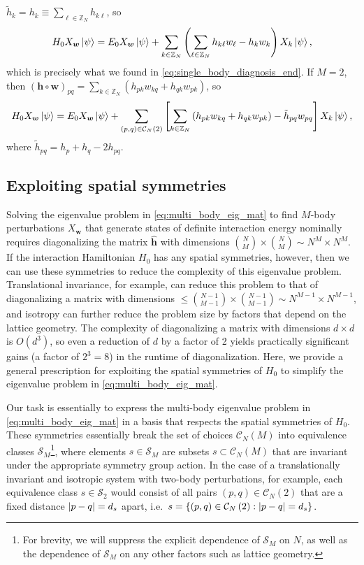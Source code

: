 \documentclass[nofootinbib,notitlepage,11pt]{revtex4-2}
\newcommand{\p}[1]{\left(#1\right)} %
\renewcommand{\sp}[1]{\left[#1\right]} %
\renewcommand{\set}[1]{\left\{#1\right\}} %
\newcommand{\m}{\bm} %
\newcommand{\1}{\mathds{1}}
\newcommand{\C}{\mathcal{C}}
\renewcommand{\S}{\mathcal{S}}
\newcommand{\ZZ}{\mathbb{Z}}
\begin{document}
$\tilde h_k = h_k \equiv \sum_{\ell\in\ZZ_N} h_{k\ell}$, so
\begin{align}
  H_0 X_{\m w} \ket\psi
  = E_0 X_{\m w} \ket\psi + \sum_{k\in\ZZ_N}
  \p{\sum_{\ell\in\ZZ_N} h_{k\ell} w_\ell - h_k w_k} X_k \ket\psi,
\end{align}
which is precisely what we found in
\eqref{eq:single_body_diagnosis_end}.  If $M=2$, then
$\p{\m h\circ\m w}_{pq} = \sum_{k\in\ZZ_N}
\p{h_{pk}w_{kq}+h_{qk}w_{pk}}$, so
\begin{align}
  H_0 X_{\m w} \ket\psi
  = E_0 X_{\m w} \ket\psi + \sum_{\p{p,q}\in\C_N\p{2}}
  \sp{\sum_{k\in\ZZ_N}\p{h_{pk} w_{kq} + h_{qk} w_{pk}}
    - \tilde h_{pq} w_{pq}}
  X_k \ket\psi,
\end{align}
where $\tilde h_{pq}=h_p+h_q-2h_{pq}$.

\subsection{Exploiting spatial symmetries}
\label{sec:symmetries}

Solving the eigenvalue problem in \eqref{eq:multi_body_eig_mat} to
find $M$-body perturbations $X_{\m w}$ that generate states of
definite interaction energy nominally requires diagonalizing the
matrix $\hat{\m h}$ with dimensions
${N\choose M}\times{N\choose M}\sim N^M\times N^M$.  If the
interaction Hamiltonian $H_0$ has any spatial symmetries, however,
then we can use these symmetries to reduce the complexity of this
eigenvalue problem.  Translational invariance, for example, can reduce
this problem to that of diagonalizing a matrix with dimensions
$\le{N-1\choose M-1}\times{N-1\choose M-1}\sim N^{M-1}\times N^{M-1}$,
and isotropy can further reduce the problem size by factors that
depend on the lattice geometry.  The complexity of diagonalizing a
matrix with dimensions $d\times d$ is $O\p{d^3}$, so even a reduction
of $d$ by a factor of 2 yields practically significant gains (a factor
of $2^3=8$) in the runtime of diagonalization.  Here, we provide a
general prescription for exploiting the spatial symmetries of $H_0$ to
simplify the eigenvalue problem in \eqref{eq:multi_body_eig_mat}.

Our task is essentially to express the multi-body eigenvalue problem
in \eqref{eq:multi_body_eig_mat} in a basis that respects the spatial
symmetries of $H_0$.  These symmetries essentially break the set of
choices $\C_N\p{M}$ into equivalence classes $\S_M$\footnote{For
  brevity, we will suppress the explicit dependence of $\S_M$ on $N$,
  as well as the dependence of $\S_M$ on any other factors such as
  lattice geometry.}, where elements $s\in\S_M$ are subsets
$s\subset\C_N\p{M}$ that are invariant under the appropriate symmetry
group action.  In the case of a translationally invariant and
isotropic system with two-body perturbations, for example, each
equivalence class $s\in\S_2$ would consist of all pairs
$\p{p,q}\in\C_N\p{2}$ that are a fixed distance $\abs{p-q}=d_s$ apart,
i.e.~$s=\set{\p{p,q}\in\C_N\p{2}:\abs{p-q}=d_s}$.
\end{document}
